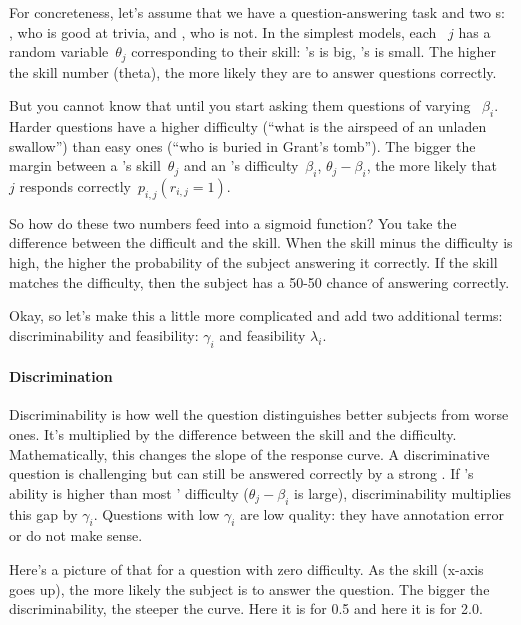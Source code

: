 For concreteness, let's assume that we have a question-answering task and two \subj{}s: \smart{},
who is good at trivia, and \dumb{}, who is not.
In the simplest \irt{} models, each \subj{}~$j$ has a random
variable~$\theta_j$ corresponding to their skill: \smart{}'s is big,
\dumb{}'s is small.  The higher the skill number
(theta), the more likely they are to answer questions correctly.

But you cannot know that until you start asking them questions of
varying ~$\beta_i$.
Harder questions have a higher difficulty (``what is the airspeed of
an unladen swallow'') than easy ones (``who is buried in Grant's
tomb'').
The bigger the margin between a \subj{}'s skill~$\theta_j$ and an \itm{}'s
difficulty~$\beta_i$, $\theta_j-\beta_i$, the more likely that \subj{}~$j$
responds correctly~$p_{i,j}(r_{i,j}=1)$.


So how do these two numbers feed into a sigmoid function?  You take the
difference between the difficult and the skill.  When the skill minus the
difficulty is high, the higher the probability of the subject answering it
correctly.  If the skill matches the difficulty, then the subject has a 50-50
chance of answering correctly.

Okay, so let’s make this a little more complicated and add two additional
terms: discriminability and feasibility: \discability{} $\gamma_i$ and
feasibility $\lambda_i$.

\paragraph{Discrimination}

Discriminability is how well the question distinguishes better subjects from
worse ones.  It’s multiplied by the difference between the skill and the
difficulty.  Mathematically, this changes the slope of the response curve.
%
A discriminative question is challenging but can still be answered
correctly by a strong \subj{}.
If \smart{}'s ability is higher than most \itms{}' difficulty
($\theta_j-\beta_i$ is large), \itm{} discriminability multiplies this
gap by $\gamma_i$.
Questions with low $\gamma_i$ are low quality: they have annotation
error or do not make sense.

Here’s a picture of that for a question with zero difficulty.  As the skill
(x-axis goes up), the more likely the subject is to answer the question.  The
bigger the discriminability, the steeper the curve.  Here it is for 0.5 and
here it is for 2.0.

